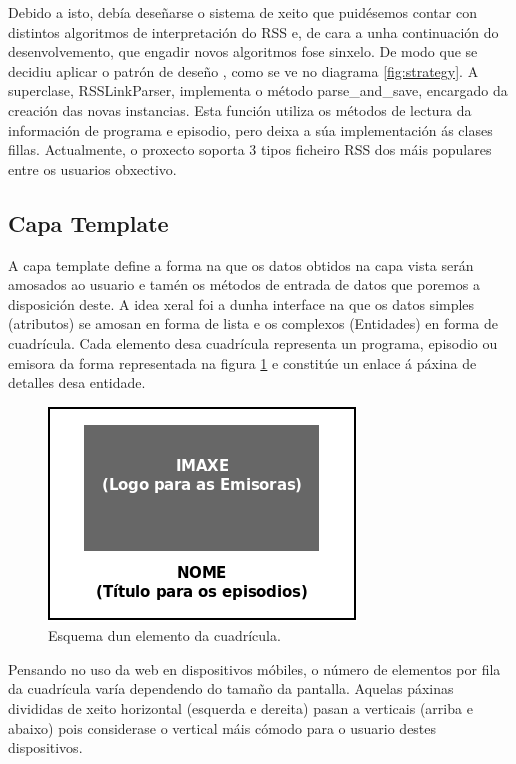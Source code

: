 Debido a isto, debía deseñarse o sistema de xeito que puidésemos contar con distintos algoritmos de interpretación do RSS e, de cara a unha continuación do desenvolvemento, que engadir novos algoritmos fose sinxelo. De modo que se decidiu aplicar o patrón de deseño , como se ve no diagrama \ref{fig:strategy}. A superclase, RSSLinkParser, implementa o método parse\_and\_save, encargado da creación das novas instancias. Esta función utiliza os métodos de lectura da información de programa e episodio, pero deixa a súa implementación ás clases fillas. Actualmente, o proxecto soporta 3 tipos ficheiro RSS dos máis populares entre os usuarios obxectivo.


\subsection{Capa Template}

A capa template define a forma na que os datos obtidos na capa vista serán amosados ao usuario e tamén os métodos de entrada de datos que poremos a disposición deste. A idea xeral foi a dunha interface na que os datos simples (atributos) se amosan en forma de lista e os complexos (Entidades) en forma de cuadrícula. Cada elemento desa cuadrícula representa un programa, episodio ou emisora da forma representada na figura \ref{fig:grella} e constitúe un enlace á páxina de detalles desa entidade.

\begin{figure}[H]
	\centering
	\includegraphics[scale=0.6,keepaspectratio=true]{./images/grella.png}
	\caption{Esquema dun elemento da cuadrícula.}
	\label{fig:grella}
\end{figure}

Pensando no uso da web en dispositivos móbiles, o número de elementos por fila da cuadrícula varía dependendo do tamaño da pantalla. Aquelas páxinas divididas de xeito horizontal (esquerda e dereita)  pasan a verticais (arriba e abaixo) pois considerase o  vertical máis cómodo para o usuario destes dispositivos. 


